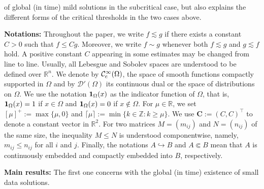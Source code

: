 \documentclass[11pt,reqno]{amsart}
\begin{document}
of global (in time) mild solutions in the subcritical case, but also explains the different forms of the critical thresholds in the two cases above. \medskip
	
	\textbf{Notations:} Throughout the paper, we write $f\lesssim g$ if there exists a constant
	$C>0$ such that $f\leq Cg$. Moreover, we write $f\sim g$ whenever both $f\lesssim g$ and $g\lesssim f$ hold. A positive constant $C$ appearing in some estimates may be changed from line to line. Usually, all Lebesgue and Sobolev spaces are understood to be defined over $\mathbb{R}^n$. We denote by $\mathcal{C}^\infty_{\rm c}(\Omega)$, the space of smooth functions compactly supported in $\Omega$ and by $\mathcal{D}'(\Omega)$ its continuous dual or the space of distributions on $\Omega$. We use the notation ${\bf 1}_{\Omega}(x)$ as the indicator function of $\Omega$, that is, ${\bf 1}_{\Omega}(x)=1$ if $x\in \Omega$ and ${\bf 1}_{\Omega}(x)=0$ if $x\not \in\Omega$. For $\mu\in\mathbb{R}$, we set $[\mu]^+:=\max\{\mu,0\}$ and $\lceil\mu\rceil:=\min\{k\in\mathbb{Z}:k\geq\mu\}$. We use $\mathbf{C}:=(C,C)^{\top}$ to denote a constant vector in $\mathbb{R}^2$. For two matrices $M=(m_{ij})$ and $N=(n_{ij})$ of the same size, the inequality $M\leq N$ is understood componentwise, namely, $m_{ij}\leq n_{ij}$ for all $i$ and $j$. Finally, the notations $A\hookrightarrow B$ and $A\Subset B$ mean that $A$ is continuously embedded and compactly embedded into $B$, respectively.\medskip
	
	\textbf{Main results:} The first one concerns with the global (in time) existence of small data solutions.
	
\end{document}
